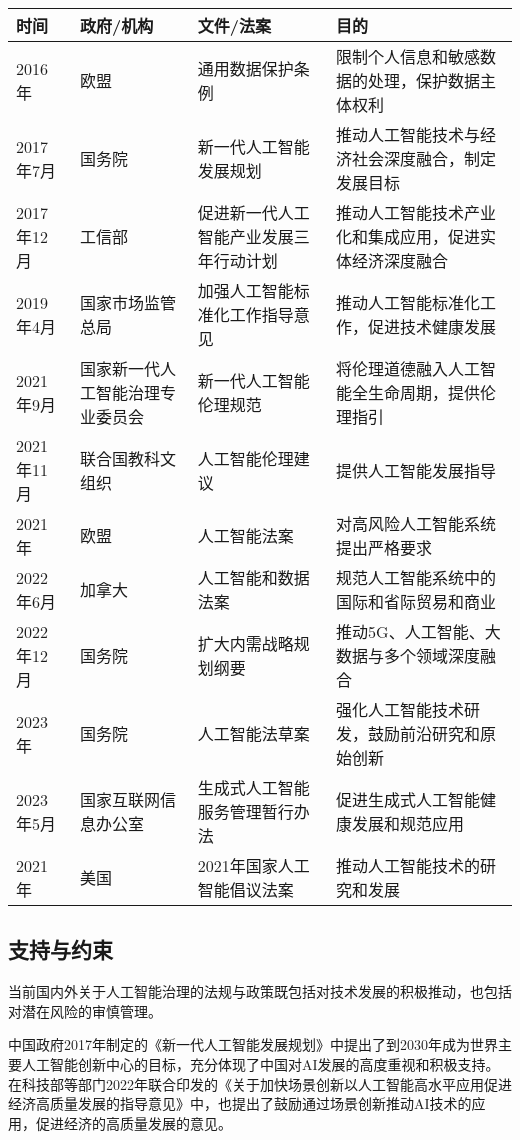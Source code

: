 \begin{table}[htbp]
\begin{tabular}{|l|l|l|l|}
\hline
\textbf{时间} & \textbf{政府/机构} & \textbf{文件/法案} & \textbf{目的} \\
\hline
2016年 & 欧盟 & 通用数据保护条例 & 限制个人信息和敏感数据的处理，保护数据主体权利 \\
\hline
2017年7月 & 国务院 & 新一代人工智能发展规划 & 推动人工智能技术与经济社会深度融合，制定发展目标 \\
\hline
2017年12月 & 工信部 & 促进新一代人工智能产业发展三年行动计划 & 推动人工智能技术产业化和集成应用，促进实体经济深度融合 \\
\hline
2019年4月 & 国家市场监管总局 & 加强人工智能标准化工作指导意见 & 推动人工智能标准化工作，促进技术健康发展 \\
\hline
2021年9月 & 国家新一代人工智能治理专业委员会 & 新一代人工智能伦理规范 & 将伦理道德融入人工智能全生命周期，提供伦理指引 \\
\hline
2021年11月 & 联合国教科文组织 & 人工智能伦理建议 & 提供人工智能发展指导 \\
\hline
2021年 & 欧盟 & 人工智能法案 & 对高风险人工智能系统提出严格要求 \\
\hline
2022年6月 & 加拿大 & 人工智能和数据法案 & 规范人工智能系统中的国际和省际贸易和商业 \\
\hline
2022年12月 & 国务院 & 扩大内需战略规划纲要 & 推动5G、人工智能、大数据与多个领域深度融合 \\
\hline
2023年 & 国务院 & 人工智能法草案 & 强化人工智能技术研发，鼓励前沿研究和原始创新 \\
\hline
2023年5月 & 国家互联网信息办公室 & 生成式人工智能服务管理暂行办法 & 促进生成式人工智能健康发展和规范应用 \\
\hline
2021年 & 美国 & 2021年国家人工智能倡议法案 & 推动人工智能技术的研究和发展 \\
\hline
\end{tabular}
\end{table}


\subsection{支持与约束}

当前国内外关于人工智能治理的法规与政策既包括对技术发展的积极推动，也包括对潜在风险的审慎管理。

中国政府2017年制定的《新⼀代⼈⼯智能发展规划》中提出了到2030年成为世界主要人工智能创新中心的目标，充分体现了中国对AI发展的高度重视和积极支持。在科技部等部门2022年联合印发的《关于加快场景创新以人工智能高水平应用促进经济高质量发展的指导意见》中，也提出了鼓励通过场景创新推动AI技术的应用，促进经济的高质量发展的意见。

